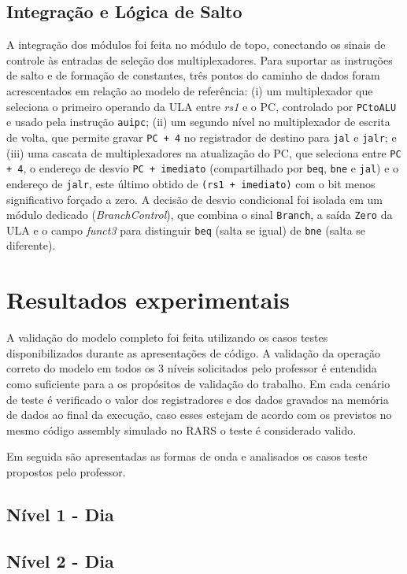 \documentclass[conference]{IEEEtran}
\begin{document}
\subsection{Integração e Lógica de Salto}
A integração dos módulos foi feita no módulo de topo, conectando os sinais de controle às entradas de
seleção dos multiplexadores. Para suportar as instruções de salto e de formação de constantes, três pontos
do caminho de dados foram acrescentados em relação ao modelo de referência: (i) um multiplexador que
seleciona o primeiro operando da ULA entre \textit{rs1} e o PC, controlado por \texttt{PCtoALU} e usado pela
instrução \texttt{auipc}; (ii) um segundo nível no multiplexador de escrita de volta, que permite gravar
\texttt{PC + 4} no registrador de destino para \texttt{jal} e \texttt{jalr}; e (iii) uma cascata de
multiplexadores na atualização do PC, que seleciona entre \texttt{PC + 4}, o endereço de desvio
\texttt{PC + imediato} (compartilhado por \texttt{beq}, \texttt{bne} e \texttt{jal}) e o endereço de
\texttt{jalr}, este último obtido de \texttt{(rs1 + imediato)} com o bit menos significativo forçado a zero.
A decisão de desvio condicional foi isolada em um módulo dedicado (\textit{BranchControl}), que combina o
sinal \texttt{Branch}, a saída \texttt{Zero} da ULA e o campo \textit{funct3} para distinguir \texttt{beq}
(salta se igual) de \texttt{bne} (salta se diferente).

\section{Resultados experimentais}

A validação do modelo completo foi feita utilizando os casos testes disponibilizados durante as apresentações de código.
A validação da operação correto do modelo em todos os 3 níveis solicitados pelo professor é entendida como suficiente para a
os propósitos de validação do trabalho. Em cada cenário de teste é verificado o valor dos registradores e dos dados gravados na memória
de dados ao final da execução, caso esses estejam de acordo com os previstos no mesmo código assembly simulado no RARS o teste é
considerado valido.

Em seguida são apresentadas as formas de onda e analisados os casos teste propostos pelo professor.
\subsection{Nível 1 - Dia }

\subsection{Nível 2 - Dia }
\end{document}
